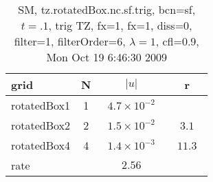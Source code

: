 \begin{table}[hbt]\tableFont %
\begin{center}
\begin{tabular}{|l|c|c|c|} \hline 
grid  & N &  $\vert u \vert$   & r \\ \hline 
         rotatedBox1 &     1 & ~$4.7\times10^{ -2}$~ &            \\ \hline
         rotatedBox2 &     2 & ~$1.5\times10^{ -2}$~ & ~$  3.1$~  \\ \hline
         rotatedBox4 &     4 & ~$1.4\times10^{ -3}$~ & ~$ 11.3$~  \\ \hline
    rate             &       &       $2.56$         &        \\ \hline
\end{tabular}
\caption{SM, tz.rotatedBox.nc.sf.trig, bcn=sf, $t=.1$, trig TZ, fx=1, fx=1, diss=0, filter=1, filterOrder=6, $\lambda=1$, cfl=0.9,  Mon Oct 19  6:46:30 2009}\label{table:tz.rotatedBox.nc.sf.trig}
\end{center}
\end{table}
